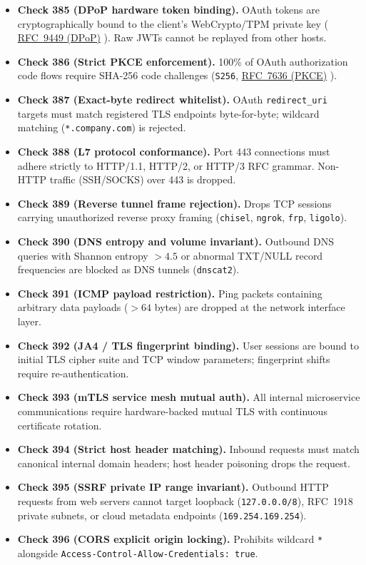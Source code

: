 \documentclass{portalciencia}
\newcommand{\linkrfcdpop}{%
  \href{https://www.rfc-editor.org/rfc/rfc9449}{RFC~9449 (DPoP)}%
}
\newcommand{\linkrfcpkce}{%
  \href{https://www.rfc-editor.org/rfc/rfc7636}{RFC~7636 (PKCE)}%
}
\theoremstyle{plain}
\theoremstyle{definition}
\begin{document}
\begin{itemize}
  \item \textbf{Check 385 (DPoP hardware token binding).} OAuth tokens are cryptographically bound to the client's WebCrypto/TPM private key (\linkrfcdpop). Raw JWTs cannot be replayed from other hosts.
  \item \textbf{Check 386 (Strict PKCE enforcement).} 100\% of OAuth authorization code flows require SHA-256 code challenges (\texttt{S256}, \linkrfcpkce).
  \item \textbf{Check 387 (Exact-byte redirect whitelist).} OAuth \texttt{redirect\_uri} targets must match registered TLS endpoints byte-for-byte; wildcard matching (\texttt{*.company.com}) is rejected.
  \item \textbf{Check 388 (L7 protocol conformance).} Port 443 connections must adhere strictly to HTTP/1.1, HTTP/2, or HTTP/3 RFC grammar. Non-HTTP traffic (SSH/SOCKS) over 443 is dropped.
  \item \textbf{Check 389 (Reverse tunnel frame rejection).} Drops TCP sessions carrying unauthorized reverse proxy framing (\texttt{chisel}, \texttt{ngrok}, \texttt{frp}, \texttt{ligolo}).
  \item \textbf{Check 390 (DNS entropy and volume invariant).} Outbound DNS queries with Shannon entropy $> 4.5$ or abnormal TXT/NULL record frequencies are blocked as DNS tunnels (\texttt{dnscat2}).
  \item \textbf{Check 391 (ICMP payload restriction).} Ping packets containing arbitrary data payloads ($> 64$ bytes) are dropped at the network interface layer.
  \item \textbf{Check 392 (JA4 / TLS fingerprint binding).} User sessions are bound to initial TLS cipher suite and TCP window parameters; fingerprint shifts require re-authentication.
  \item \textbf{Check 393 (mTLS service mesh mutual auth).} All internal microservice communications require hardware-backed mutual TLS with continuous certificate rotation.
  \item \textbf{Check 394 (Strict host header matching).} Inbound requests must match canonical internal domain headers; host header poisoning drops the request.
  \item \textbf{Check 395 (SSRF private IP range invariant).} Outbound HTTP requests from web servers cannot target loopback (\texttt{127.0.0.0/8}), RFC~1918 private subnets, or cloud metadata endpoints (\texttt{169.254.169.254}).
  \item \textbf{Check 396 (CORS explicit origin locking).} Prohibits wildcard \texttt{*} alongside \texttt{Access-Control-Allow-Credentials: true}.

\end{itemize}
\end{document}
